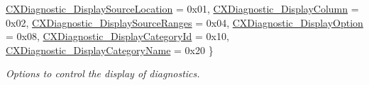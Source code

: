 \begin{DoxyCompactItemize}
\mbox{\hyperlink{group__CINDEX__DIAG_gga0545c7c3ef36a397c44d142b0385b8d1a76bde2a9967db9f7338d407bad83700e}{C\+X\+Diagnostic\+\_\+\+Display\+Source\+Location}} = 0x01, 
\mbox{\hyperlink{group__CINDEX__DIAG_gga0545c7c3ef36a397c44d142b0385b8d1a6a94e17efbf896be95d99a1dc6708fc7}{C\+X\+Diagnostic\+\_\+\+Display\+Column}} = 0x02, 
\mbox{\hyperlink{group__CINDEX__DIAG_gga0545c7c3ef36a397c44d142b0385b8d1af46dbea10e55ecdc6a99d55f30813dcc}{C\+X\+Diagnostic\+\_\+\+Display\+Source\+Ranges}} = 0x04, 
\mbox{\hyperlink{group__CINDEX__DIAG_gga0545c7c3ef36a397c44d142b0385b8d1a79859f540b8fba954e0332ebd5eb3fdb}{C\+X\+Diagnostic\+\_\+\+Display\+Option}} = 0x08, 
\newline
\mbox{\hyperlink{group__CINDEX__DIAG_gga0545c7c3ef36a397c44d142b0385b8d1ab27a36f7c273ff376a52b71673eb404e}{C\+X\+Diagnostic\+\_\+\+Display\+Category\+Id}} = 0x10, 
\mbox{\hyperlink{group__CINDEX__DIAG_gga0545c7c3ef36a397c44d142b0385b8d1af0a8c2b64bc9a26a1cc336a2fa532056}{C\+X\+Diagnostic\+\_\+\+Display\+Category\+Name}} = 0x20
 \}
\begin{DoxyCompactList}\small\item\em Options to control the display of diagnostics. \end{DoxyCompactList}\end{DoxyCompactItemize}
